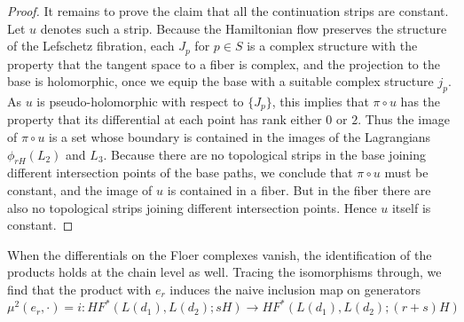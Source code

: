 \documentclass[12pt]{amsart}
\begin{document}
\begin{proof}
It remains to prove the claim that all the continuation strips are constant. Let $u$ denotes such a strip. Because the Hamiltonian flow preserves the structure of the Lefschetz fibration, each $J_p$ for $p \in S$ is a complex structure with the property that the tangent space to a fiber is complex, and the projection to the base is holomorphic, once we equip the base with a suitable complex structure $j_p$. As $u$ is pseudo-holomorphic with respect to $\{J_p\}$, this implies that $\pi \circ u$ has the property that its differential at each point has rank either $0$ or $2$. Thus the image of $\pi \circ u$ is a set whose boundary is contained in the images of the Lagrangians $\phi_{rH}(L_2)$ and $L_3$. Because there are no topological strips in the base joining different intersection points of the base paths, we conclude that $\pi \circ u$ must be constant, and the image of $u$ is contained in a fiber. But in the fiber there are also no topological strips joining different intersection points. Hence $u$ itself is constant.
\end{proof}

When the differentials on the Floer complexes vanish, the identification of the products holds at the chain level
as well. Tracing the isomorphisms through, we find that
the product with $e_r$ induces the naive inclusion map on generators
\begin{equation}
  \mu^2(e_r,\cdot) = i : HF^*(L(d_1),L(d_2); sH) \to HF^*(L(d_1),L(d_2);(r+s)H)
\end{equation}


\end{document}
